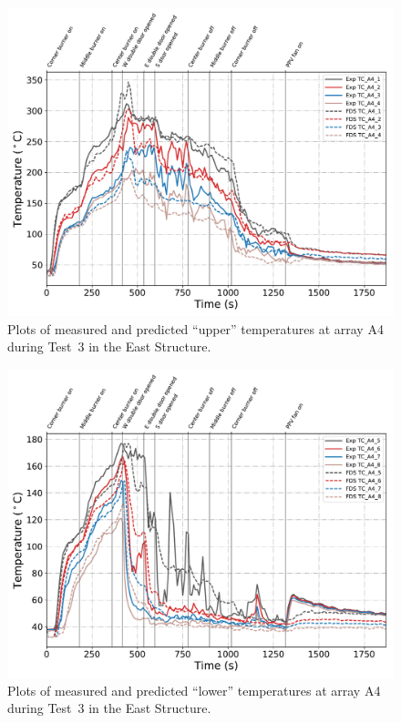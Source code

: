 \clearpage
\begin{figure}[p]
	\centering
	\includegraphics[width=\columnwidth]{Figures/Plots/Validation/Temperature/Test_3_TC_A4_upper}
	\caption{Plots of measured and predicted ``upper'' temperatures at array A4 during Test~3 in the East Structure.}
	\label{fig:TCA4_upper_data_Test3}
\end{figure}
\begin{figure}[p]
	\centering
	\includegraphics[width=\columnwidth]{Figures/Plots/Validation/Temperature/Test_3_TC_A4_lower}
	\caption{Plots of measured and predicted ``lower'' temperatures at array A4 during Test~3 in the East Structure.}
	\label{fig:TCA4_lower_data_Test3}
\end{figure}

